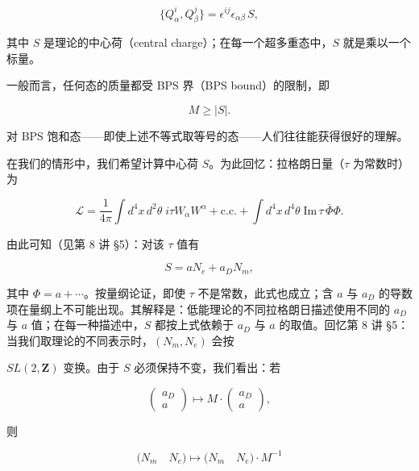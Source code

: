 \[
  \{Q^i_\alpha,Q^j_\beta\}=\epsilon^{ij}\epsilon_{\alpha\beta}\,S,
\]

其中 $S$ 是理论的中心荷（central charge）；在每一个超多重态中，$S$ 就是乘以一个标量。


一般而言，任何态的质量都受 BPS 界（BPS bound）的限制，即

\[
  M\ge|S| .
\]

对 BPS 饱和态——即使上述不等式取等号的态——人们往往能获得很好的理解。

在我们的情形中，我们希望计算中心荷 $S$。为此回忆：拉格朗日量（$\tau$ 为常数时）为

\[
  \mathcal{L}=\frac{1}{4\pi}\int d^4x\,d^2\theta\;i\tau W_\alpha W^\alpha
  +\text{c.c.}
  +\int d^4x\,d^4\theta\;\mathrm{Im}\,\tau\,\bar\Phi\Phi .
\]

由此可知（见第 8 讲 §5）：对该 $\tau$ 值有

\[
  S=aN_e+a_DN_m,
\]

其中 $\Phi=a+\cdots$。按量纲论证，即使 $\tau$ 不是常数，此式也成立；含 $a$ 与 $a_D$ 的导数项在量纲上不可能出现。其解释是：低能理论的不同拉格朗日描述使用不同的 $a_D$ 与 $a$ 值；在每一种描述中，$S$ 都按上式依赖于 $a_D$ 与 $a$ 的取值。回忆第 8 讲 §5：当我们取理论的不同表示时，$(N_m,N_e)$ 会按


$SL(2,\mathbf{Z})$ 变换。由于 $S$ 必须保持不变，我们看出：若

\[
  \begin{pmatrix} a_D\\ a\end{pmatrix}
  \longmapsto M\cdot\begin{pmatrix} a_D\\ a\end{pmatrix},
\]

则

\[
  \bigl(N_m\quad N_e\bigr)\longmapsto
  \bigl(N_m\quad N_e\bigr)\cdot M^{-1}
\]

